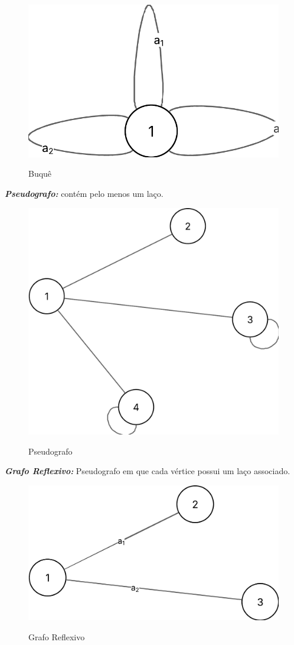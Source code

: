 	\begin{figure} [H]
		\centering
		\caption{Buquê}%
		\label{fig:buquê}%
		\includegraphics[width=0.5\linewidth,angle=0]{figuras/tiposgrafos/buque.png}%
		\\
	\end{figure}
	\textit{\textbf{Pseudografo:}} contém pelo menos um laço. \\ 
	\begin{figure} [H]
		\centering
		\caption{Pseudografo}%
		\label{fig:pseudografo}%
		\includegraphics[width=0.5\linewidth,angle=0]{figuras/tiposgrafos/pseudografo.png}%
		\\
	\end{figure}
	\textit{\textbf{Grafo Reflexivo:}} Pseudografo em que cada vértice possui um laço associado.\\
		\begin{figure} [H]
			\centering
			\caption{Grafo Reflexivo}%
			\label{fig:grafReflex}%
			\includegraphics[width=0.5\linewidth,angle=0]{figuras/tiposgrafos/grafReflex.png}%
			\\
		\end{figure}

